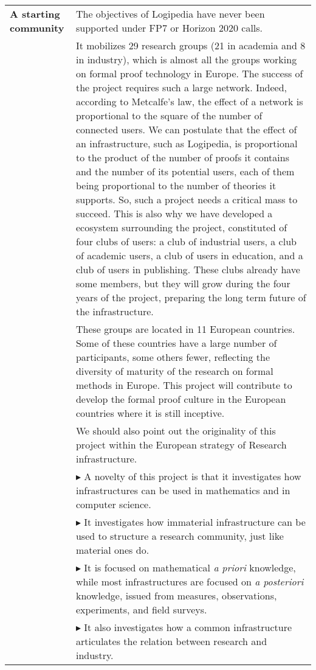 \begin{longtable}{|p{}|p{}|}
{\bf A starting community} & The objectives of Logipedia have never
been supported under FP7 or Horizon 2020 calls.\\
& \hspace{0.4cm} It mobilizes 29 research groups (21 in academia and 8
in industry), which is almost all the groups working on formal proof
technology in Europe.  The success of the project requires such a
large network.  Indeed, according to Metcalfe's law, the effect of a
network is proportional to the square of the number of connected
users. We can postulate that the effect of an infrastructure, such as
Logipedia, is proportional to the product of the number of proofs it
contains and the number of its potential users, each of them being
proportional to the number of theories it supports. So, such a project
needs a critical mass to succeed. This is also why we have developed a
ecosystem surrounding the project, constituted of four clubs of users:
a club of industrial users, a club of academic users, a club of users
in education, and a club of users in publishing.  These clubs already
have some members, but they will grow during the four years of the
project, preparing the long term future of the infrastructure.\\
& \hspace{0.4cm} These groups are located in 11 European countries.
Some of these countries have a large number of participants, some
others fewer, reflecting the diversity of maturity of the research on
formal methods in Europe. This project will contribute to develop the
formal proof
culture in the European countries where it is still inceptive.\\
& \hspace{0.4cm} We should also point out the originality of this
project within the
European strategy of Research infrastructure.\\
& $\blacktriangleright$ A novelty of this project is that it
investigates how infrastructures can be used in mathematics and in
computer science.\\
& $\blacktriangleright$ It investigates how immaterial infrastructure
can be used to structure a research community, just like material ones
do.\\
& $\blacktriangleright$ It is focused on mathematical {\em a priori}
knowledge, while most infrastructures are focused on {\em a
  posteriori} knowledge, issued from measures, observations,
experiments, and field surveys.\\
& $\blacktriangleright$ It also investigates how a common
infrastructure articulates the relation between research and industry.
\\
\hline


\end{longtable}
